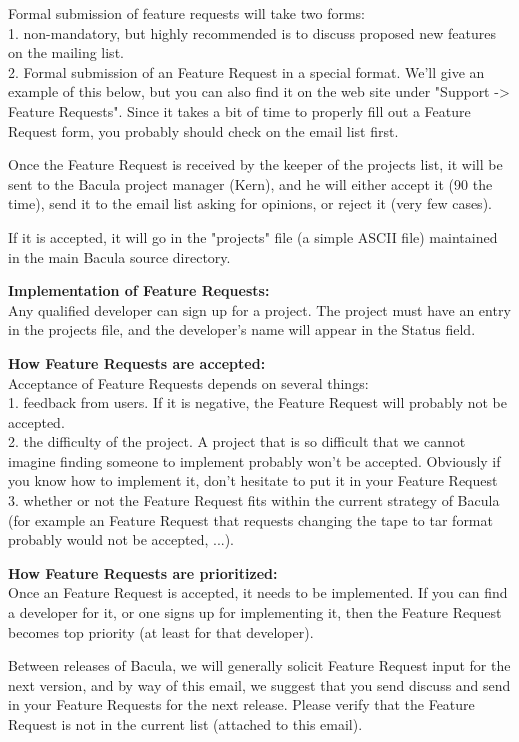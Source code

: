Formal submission of feature requests will take two forms: \\
1. non-mandatory, but highly recommended is to discuss proposed new features
on the mailing list.\\
2.  Formal submission of an Feature Request in a special format.  We'll
give an example of this below, but you can also find it on the web site
under "Support -{\textgreater} Feature Requests".  Since it takes a bit of time to
properly fill out a Feature Request form, you probably should check on the
email list first.

Once the Feature Request is received by the keeper of the projects list, it
will be sent to the Bacula project manager (Kern), and he will either
accept it (90%
the time), send it to the email list asking for opinions, or reject it
(very few cases).

If it is accepted, it will go in the "projects" file (a simple ASCII file)
maintained in the main Bacula source directory.

{\bf Implementation of Feature Requests:}\\
Any qualified developer can sign up for a project.  The project must have
an entry in the projects file, and the developer's name will appear in the
Status field.

{\bf How Feature Requests are accepted:}\\
Acceptance of Feature Requests depends on several things: \\
1.  feedback from users.  If it is negative, the Feature Request will probably not be
accepted.  \\
2.  the difficulty of the project.  A project that is so
difficult that we cannot imagine finding someone to implement probably won't
be accepted. Obviously if you know how to implement it, don't hesitate
to put it in your Feature Request  \\
 3.  whether or not the Feature Request fits within the current strategy of
Bacula (for example an Feature Request that requests changing the tape to
tar format probably would not be accepted, ...).

{\bf How Feature Requests are prioritized:}\\
Once an Feature Request is accepted, it needs to be implemented.  If you
can find a developer for it, or one signs up for implementing it, then the
Feature Request becomes top priority (at least for that developer).

Between releases of Bacula, we will generally solicit Feature Request input
for the next version, and by way of this email, we suggest that you send
discuss and send in your Feature Requests for the next release.  Please
verify that the Feature Request is not in the current list (attached to this email).

